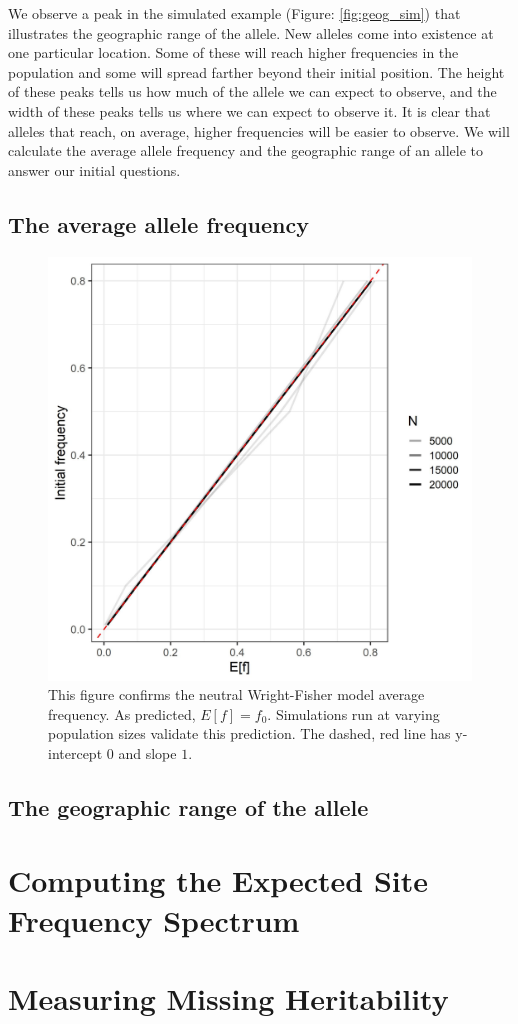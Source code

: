 We observe a peak in the simulated example (Figure: \ref{fig:geog_sim}) that illustrates the geographic range of the allele. New alleles come into existence at one particular location. Some of these will reach higher frequencies in the population and some will spread farther beyond their initial position. The height of these peaks tells us how much of the allele we can expect to observe, and the width of these peaks tells us where we can expect to observe it. It is clear that alleles that reach, on average, higher frequencies will be easier to observe. We will calculate the average allele frequency and the geographic range of an allele to answer our initial questions.



\subsection{The average allele frequency}

\begin{figure}[h]
    \centering
    \includegraphics[scale=0.5]{img/mean_f.jpg}
    \caption{This figure confirms the neutral Wright-Fisher model average frequency. As predicted, $E[f] = f_0$. Simulations run at varying population sizes validate this prediction. The dashed, red line has y-intercept $0$ and slope $1$.}
    \label{fig:neutral_wf}
\end{figure}
 

\subsection{The geographic range of the allele}


\section{Computing the Expected Site Frequency Spectrum}

\section{Measuring Missing Heritability}
